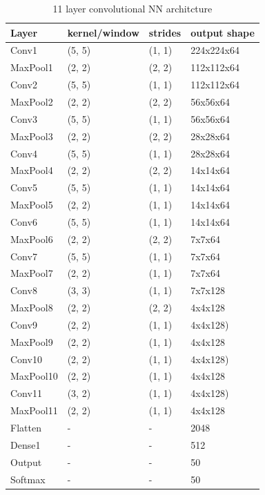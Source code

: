 \documentclass[a4paper]{article}
\begin{document}
\begin{table}[!hbt]
    \caption{ 11 layer convolutional NN architcture
    \label{table:layers11}
    }
\begin{center}
    \begin{tabular}{| l | l | l | l |}
    \hline
        Layer & kernel/window& strides & output shape\\
    \hline
        Conv1  & (5, 5)&        (1, 1)&     224x224x64  \\
    \hline
        MaxPool1 & (2, 2)&      (2, 2)&     112x112x64  \\
        Conv2  & (5, 5)&        (1, 1)&     112x112x64  \\
    \hline
        MaxPool2 & (2, 2)&      (2, 2)&     56x56x64    \\
        Conv3  & (5, 5)&        (1, 1)&     56x56x64    \\
    \hline
        MaxPool3 & (2, 2)&      (2, 2)&     28x28x64    \\
        Conv4  & (5, 5)&        (1, 1)&     28x28x64  \\
    \hline
        MaxPool4 & (2, 2)&      (2, 2)&     14x14x64  \\
        Conv5  & (5, 5)&        (1, 1)&     14x14x64  \\ %
    \hline
        MaxPool5 & (2, 2)&      (1, 1)&     14x14x64  \\
        Conv6  & (5, 5)&        (1, 1)&     14x14x64  \\
    \hline
        MaxPool6 & (2, 2)&      (2, 2)&     7x7x64  \\
        Conv7  & (5, 5)&        (1, 1)&     7x7x64  \\  %
    \hline
        MaxPool7 & (2, 2)&      (1, 1)&     7x7x64  \\
        Conv8  & (3, 3)&        (1, 1)&     7x7x128\\
    \hline
        MaxPool8 & (2, 2)&      (2, 2)&     4x4x128  \\
        Conv9  & (2, 2)&        (1, 1)&     4x4x128)\\
    \hline
        MaxPool9 & (2, 2)&      (1, 1)&     4x4x128  \\
        Conv10 & (2, 2)&        (1, 1)&     4x4x128)\\  %
    \hline
        MaxPool10 & (2, 2)&      (1, 1)&     4x4x128  \\
        Conv11 & (3, 2)&        (1, 1)&     4x4x128)\\  %
    \hline
        MaxPool11 & (2, 2)&      (1, 1)&     4x4x128  \\
        Flatten & - & - & 2048 \\
        Dense1 & - & - & 512 \\
    \hline
        Output & - & - & 50 \\
        Softmax & - & - & 50 \\
    \hline
    \end{tabular}
\end{center}
\end{table}
\end{document}
